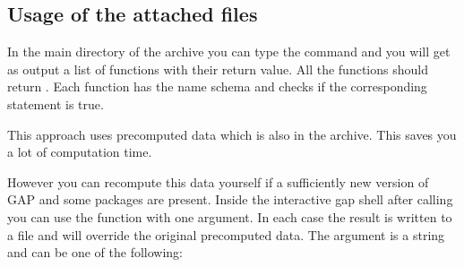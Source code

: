\documentclass[a4paper,11pt]{amsart}
\begin{document}
\subsection{Usage of the attached files}
In the main directory of the archive you can type the command  and 
you will get as output a list of functions with their return value. All the functions should
return . Each function has the name schema  and checks
if the corresponding statement is true.

This approach uses precomputed data which is also in the archive. This saves you a lot of
computation time.

However you can recompute this data yourself if a sufficiently new version of GAP and
some packages are present. Inside the interactive gap shell after calling 
you can use the function  with one argument. In each case
the result is written to a file and will override the original precomputed data. The 
argument is a string and can be one of the following:
\end{document}
